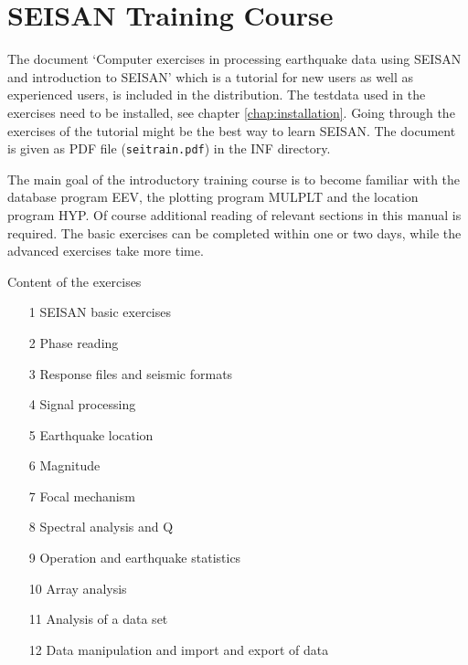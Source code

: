 \chapter{SEISAN Training Course} 
\label{chap:training}

The document `Computer exercises in processing earthquake data using 
SEISAN and introduction to SEISAN' which is a tutorial for new users 
as well as experienced users, is included in the distribution. The 
testdata used in the exercises need to be installed, see %
chapter \ref{chap:installation}. 
Going through the exercises of the tutorial might be the best way 
to learn SEISAN. The document is given as PDF file 
(\texttt{seitrain.pdf}) 
in the INF directory. 

The main goal of the introductory training course is to become familiar 
with the database program EEV, the plotting program MULPLT and the 
location program HYP. Of course additional reading of relevant sections 
in this manual is required. The basic exercises can be completed within 
one or two days, while the advanced exercises take more time. 

Content of the exercises 

\begin{enumerate}
\item[1] SEISAN basic exercises 
\item[2] Phase reading 
\item[3] Response files and seismic formats 
\item[4] Signal processing 
\item[5] Earthquake location 
\item[6] Magnitude 
\item[7] Focal mechanism 
\item[8] Spectral analysis and Q 
\item[9] Operation and earthquake statistics 
\item[10] Array analysis 
\item[11] Analysis of a data set 
\item[12] Data manipulation and import and export of data 
\end{enumerate}

